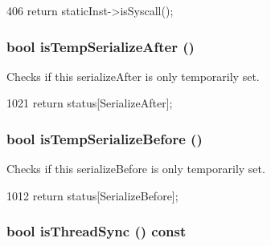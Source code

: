 \begin{DoxyCode}
406     { return staticInst->isSyscall(); }
\end{DoxyCode}
\hypertarget{classInOrderDynInst_a8d1ad9904dbbde344554070bfaaab86f}{
\subsubsection[{isTempSerializeAfter}]{\setlength{\rightskip}{0pt plus 5cm}bool isTempSerializeAfter ()}}
\label{classInOrderDynInst_a8d1ad9904dbbde344554070bfaaab86f}
Checks if this serializeAfter is only temporarily set. 


\begin{DoxyCode}
1021 { return status[SerializeAfter]; }
\end{DoxyCode}
\hypertarget{classInOrderDynInst_a4df2bcaf5414d6db99fb8a5b0aba708a}{
\subsubsection[{isTempSerializeBefore}]{\setlength{\rightskip}{0pt plus 5cm}bool isTempSerializeBefore ()}}
\label{classInOrderDynInst_a4df2bcaf5414d6db99fb8a5b0aba708a}
Checks if this serializeBefore is only temporarily set. 


\begin{DoxyCode}
1012 { return status[SerializeBefore]; }
\end{DoxyCode}
\hypertarget{classInOrderDynInst_ae1376a5b7bbe66f8bcf8b3517802c85f}{
\subsubsection[{isThreadSync}]{\setlength{\rightskip}{0pt plus 5cm}bool isThreadSync () const}}
\label{classInOrderDynInst_ae1376a5b7bbe66f8bcf8b3517802c85f}



